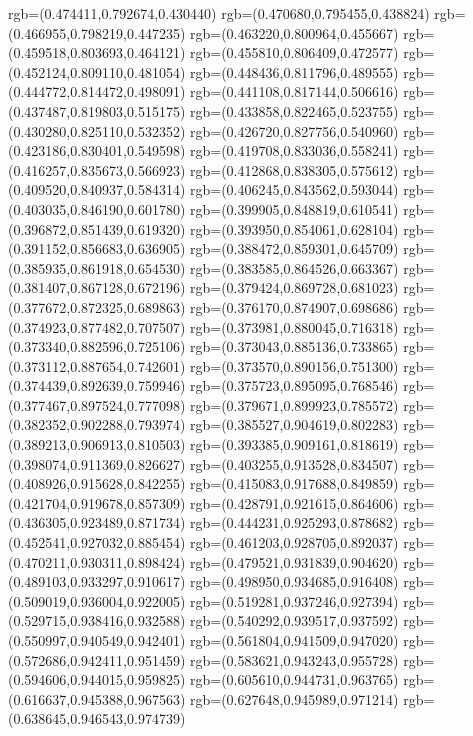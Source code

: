 {{{			rgb=(0.474411,0.792674,0.430440)
			rgb=(0.470680,0.795455,0.438824)
			rgb=(0.466955,0.798219,0.447235)
			rgb=(0.463220,0.800964,0.455667)
			rgb=(0.459518,0.803693,0.464121)
			rgb=(0.455810,0.806409,0.472577)
			rgb=(0.452124,0.809110,0.481054)
			rgb=(0.448436,0.811796,0.489555)
			rgb=(0.444772,0.814472,0.498091)
			rgb=(0.441108,0.817144,0.506616)
			rgb=(0.437487,0.819803,0.515175)
			rgb=(0.433858,0.822465,0.523755)
			rgb=(0.430280,0.825110,0.532352)
			rgb=(0.426720,0.827756,0.540960)
			rgb=(0.423186,0.830401,0.549598)
			rgb=(0.419708,0.833036,0.558241)
			rgb=(0.416257,0.835673,0.566923)
			rgb=(0.412868,0.838305,0.575612)
			rgb=(0.409520,0.840937,0.584314)
			rgb=(0.406245,0.843562,0.593044)
			rgb=(0.403035,0.846190,0.601780)
			rgb=(0.399905,0.848819,0.610541)
			rgb=(0.396872,0.851439,0.619320)
			rgb=(0.393950,0.854061,0.628104)
			rgb=(0.391152,0.856683,0.636905)
			rgb=(0.388472,0.859301,0.645709)
			rgb=(0.385935,0.861918,0.654530)
			rgb=(0.383585,0.864526,0.663367)
			rgb=(0.381407,0.867128,0.672196)
			rgb=(0.379424,0.869728,0.681023)
			rgb=(0.377672,0.872325,0.689863)
			rgb=(0.376170,0.874907,0.698686)
			rgb=(0.374923,0.877482,0.707507)
			rgb=(0.373981,0.880045,0.716318)
			rgb=(0.373340,0.882596,0.725106)
			rgb=(0.373043,0.885136,0.733865)
			rgb=(0.373112,0.887654,0.742601)
			rgb=(0.373570,0.890156,0.751300)
			rgb=(0.374439,0.892639,0.759946)
			rgb=(0.375723,0.895095,0.768546)
			rgb=(0.377467,0.897524,0.777098)
			rgb=(0.379671,0.899923,0.785572)
			rgb=(0.382352,0.902288,0.793974)
			rgb=(0.385527,0.904619,0.802283)
			rgb=(0.389213,0.906913,0.810503)
			rgb=(0.393385,0.909161,0.818619)
			rgb=(0.398074,0.911369,0.826627)
			rgb=(0.403255,0.913528,0.834507)
			rgb=(0.408926,0.915628,0.842255)
			rgb=(0.415083,0.917688,0.849859)
			rgb=(0.421704,0.919678,0.857309)
			rgb=(0.428791,0.921615,0.864606)
			rgb=(0.436305,0.923489,0.871734)
			rgb=(0.444231,0.925293,0.878682)
			rgb=(0.452541,0.927032,0.885454)
			rgb=(0.461203,0.928705,0.892037)
			rgb=(0.470211,0.930311,0.898424)
			rgb=(0.479521,0.931839,0.904620)
			rgb=(0.489103,0.933297,0.910617)
			rgb=(0.498950,0.934685,0.916408)
			rgb=(0.509019,0.936004,0.922005)
			rgb=(0.519281,0.937246,0.927394)
			rgb=(0.529715,0.938416,0.932588)
			rgb=(0.540292,0.939517,0.937592)
			rgb=(0.550997,0.940549,0.942401)
			rgb=(0.561804,0.941509,0.947020)
			rgb=(0.572686,0.942411,0.951459)
			rgb=(0.583621,0.943243,0.955728)
			rgb=(0.594606,0.944015,0.959825)
			rgb=(0.605610,0.944731,0.963765)
			rgb=(0.616637,0.945388,0.967563)
			rgb=(0.627648,0.945989,0.971214)
			rgb=(0.638645,0.946543,0.974739)
}}}
